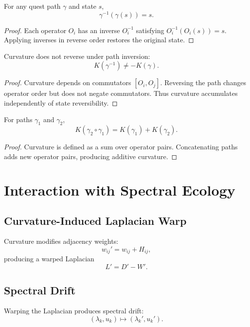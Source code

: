 \begin{theorem}
For any quest path $\gamma$ and state $s$,
\[
\gamma^{-1}(\gamma(s)) = s.
\]
\end{theorem}

\begin{proof}
Each operator $O_i$ has an inverse $O_i^{-1}$ satisfying
$O_i^{-1}(O_i(s)) = s$. Applying inverses in reverse order restores the
original state.
\end{proof}

\begin{theorem}
Curvature does not reverse under path inversion:
\[
K(\gamma^{-1}) \neq -K(\gamma).
\]
\end{theorem}

\begin{proof}
Curvature depends on commutators $[O_i, O_j]$. Reversing the path changes
operator order but does not negate commutators. Thus curvature accumulates
independently of state reversibility.
\end{proof}

\begin{theorem}
For paths $\gamma_1$ and $\gamma_2$,
\[
K(\gamma_2 \circ \gamma_1)
    = K(\gamma_1) + K(\gamma_2).
\]
\end{theorem}

\begin{proof}
Curvature is defined as a sum over operator pairs. Concatenating paths
adds new operator pairs, producing additive curvature.
\end{proof}

\section{Interaction with Spectral Ecology}

\subsection{Curvature-Induced Laplacian Warp}
Curvature modifies adjacency weights:
\[
w_{ij}' = w_{ij} + H_{ij},
\]
producing a warped Laplacian
\[
L' = D' - W'.
\]

\subsection{Spectral Drift}
Warping the Laplacian produces spectral drift:
\[
(\lambda_k, u_k) \mapsto (\lambda_k', u_k').
\]

